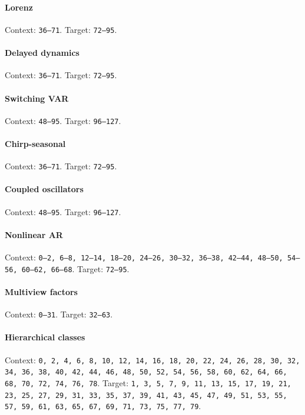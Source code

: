\paragraph{Lorenz} Context: \texttt{36--71}. Target: \texttt{72--95}.

\paragraph{Delayed dynamics} Context: \texttt{36--71}. Target: \texttt{72--95}.

\paragraph{Switching VAR} Context: \texttt{48--95}. Target: \texttt{96--127}.

\paragraph{Chirp-seasonal} Context: \texttt{36--71}. Target: \texttt{72--95}.

\paragraph{Coupled oscillators} Context: \texttt{48--95}. Target: \texttt{96--127}.

\paragraph{Nonlinear AR} Context: \texttt{0--2, 6--8, 12--14, 18--20, 24--26, 30--32, 36--38, 42--44, 48--50, 54--56, 60--62, 66--68}. Target: \texttt{72--95}.

\paragraph{Multiview factors} Context: \texttt{0--31}. Target: \texttt{32--63}.

\paragraph{Hierarchical classes} Context: \texttt{0, 2, 4, 6, 8, 10, 12, 14, 16, 18, 20, 22, 24, 26, 28, 30, 32, 34, 36, 38, 40, 42, 44, 46, 48, 50, 52, 54, 56, 58, 60, 62, 64, 66, 68, 70, 72, 74, 76, 78}. Target: \texttt{1, 3, 5, 7, 9, 11, 13, 15, 17, 19, 21, 23, 25, 27, 29, 31, 33, 35, 37, 39, 41, 43, 45, 47, 49, 51, 53, 55, 57, 59, 61, 63, 65, 67, 69, 71, 73, 75, 77, 79}.

